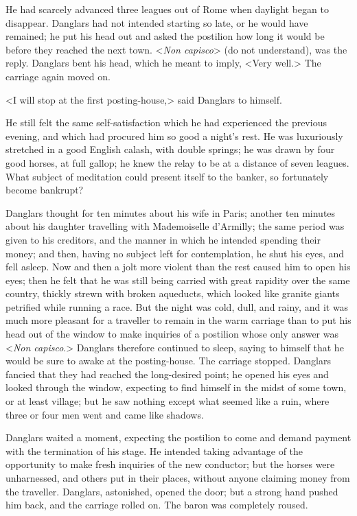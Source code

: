  He had scarcely advanced three leagues out of Rome when daylight began to disappear. Danglars had not intended starting so late, or he would have remained; he put his head out and asked the postilion how long it would be before they reached the next town. <\textit{Non capisco}> (do not understand), was the reply. Danglars bent his head, which he meant to imply, <Very well.> The carriage again moved on. 

 <I will stop at the first posting-house,> said Danglars to himself. 

 He still felt the same self-satisfaction which he had experienced the previous evening, and which had procured him so good a night's rest. He was luxuriously stretched in a good English calash, with double springs; he was drawn by four good horses, at full gallop; he knew the relay to be at a distance of seven leagues. What subject of meditation could present itself to the banker, so fortunately become bankrupt? 

 Danglars thought for ten minutes about his wife in Paris; another ten minutes about his daughter travelling with Mademoiselle d'Armilly; the same period was given to his creditors, and the manner in which he intended spending their money; and then, having no subject left for contemplation, he shut his eyes, and fell asleep. Now and then a jolt more violent than the rest caused him to open his eyes; then he felt that he was still being carried with great rapidity over the same country, thickly strewn with broken aqueducts, which looked like granite giants petrified while running a race. But the night was cold, dull, and rainy, and it was much more pleasant for a traveller to remain in the warm carriage than to put his head out of the window to make inquiries of a postilion whose only answer was <\textit{Non capisco}.>  Danglars therefore continued to sleep, saying to himself that he would be sure to awake at the posting-house. The carriage stopped. Danglars fancied that they had reached the long-desired point; he opened his eyes and looked through the window, expecting to find himself in the midst of some town, or at least village; but he saw nothing except what seemed like a ruin, where three or four men went and came like shadows. 

 Danglars waited a moment, expecting the postilion to come and demand payment with the termination of his stage. He intended taking advantage of the opportunity to make fresh inquiries of the new conductor; but the horses were unharnessed, and others put in their places, without anyone claiming money from the traveller. Danglars, astonished, opened the door; but a strong hand pushed him back, and the carriage rolled on. The baron was completely roused. 

